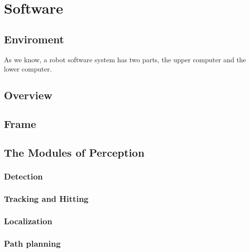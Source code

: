 \section{Software}
\subsection{Enviroment}

As we know, a robot software system has two parts, the upper computer and the lower computer.

\subsection{Overview}
\subsection{Frame}
\subsection{The Modules of Perception}
	\subsubsection{Detection}



	\subsubsection{Tracking and Hitting}
	\subsubsection{Localization}
	\subsubsection{Path planning}
\pagebreak